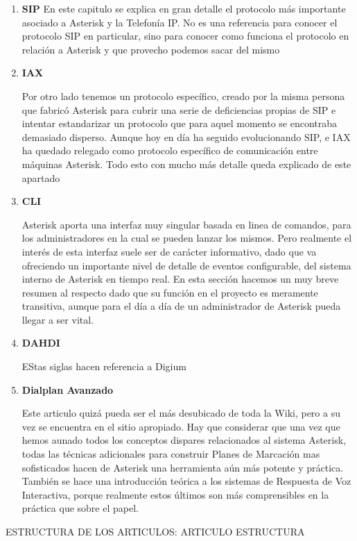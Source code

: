 \begin{enumerate}
	  \setlength{\itemsep}{10pt}

	\item \textbf{SIP}
	En este capitulo se explica en gran detalle el protocolo más importante asociado a Asterisk y la Telefonía IP. No es una referencia para conocer el protocolo SIP en particular, sino para conocer como funciona el protocolo en relación a Asterisk y que provecho podemos sacar del mismo
	
	\item \textbf{IAX}
	
	Por otro lado tenemos un protocolo específico, creado por la misma persona que fabricó Asterisk para cubrir una serie de deficiencias propias de SIP e intentar estandarizar un protocolo que para aquel momento se encontraba demasiado disperso. Aunque hoy en día ha seguido evolucionando SIP, e IAX ha quedado relegado como protocolo específico de comunicación entre máquinas Asterisk. Todo esto con mucho más  detalle queda explicado de este apartado
	
	\item \textbf{CLI}
	
	Asterisk aporta una interfaz muy singular basada en linea de comandos, para los administradores en la cual se pueden lanzar los mismos. Pero realmente el interés de esta interfaz suele ser de carácter informativo, dado que va ofreciendo un importante nivel de detalle de eventos configurable, del sistema interno de Asterisk en tiempo real. En esta sección hacemos un muy breve resumen al respecto dado que su función en el proyecto es meramente transitiva, aunque para el día a día de un administrador de Asterisk pueda llegar a ser vital.
	
	\item \textbf{DAHDI}
	
	EStas siglas hacen referencia a Digium
	
  \item \textbf{Dialplan Avanzado}
	
	Este articulo quizá pueda ser el más desubicado de toda la Wiki, pero a su vez se encuentra en el sitio apropiado. Hay que considerar que una vez que hemos aunado todos los conceptos dispares relacionados al sistema Asterisk, todas las técnicas adicionales para construir Planes de Marcación mas sofisticados hacen de Asterisk una herramienta aún más potente y práctica. También se hace una introducción teórica a los sistemas de Respuesta de Voz Interactiva, porque realmente estos últimos son más comprensibles en la práctica que sobre el papel.
	
\end{enumerate}



ESTRUCTURA DE LOS ARTICULOS: ARTICULO ESTRUCTURA
